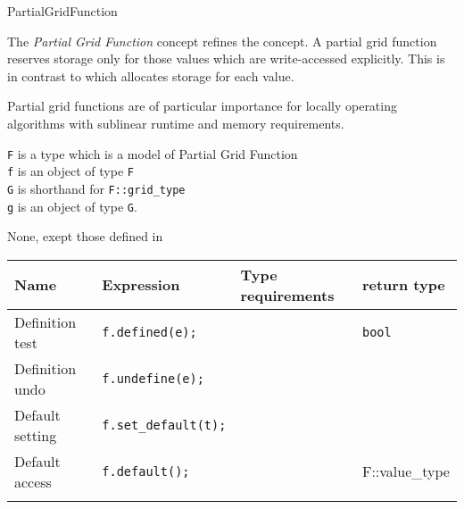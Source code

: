 \begin{Label}{PartialGridFunction}
\end{Label}


The  {\em Partial Grid Function\/} concept refines the 
 concept.
A partial grid function reserves storage only for those values which are
write-accessed explicitly.
This is in contrast to 
which allocates storage for each value.

Partial grid functions are of particular importance for locally operating 
algorithms with sublinear runtime and memory requirements.


{\tt F} is a type which is a model of  Partial Grid  Function 
\\
{\tt f} is an object of type  {\tt F}
\\
{\tt G} is shorthand for  {\tt F::grid\_type}
\\
{\tt g} is an object of type  {\tt G}.

\begin{ifhtml}
None, exept those defined in
\end{ifhtml}

\begin{tabular}{llll} 
  \hline
  \bf  Name  &\bf  Expression  &\bf  Type requirements  & \bf  return type  \\ 
  \hline
  Definition test  &
  {\tt f.defined(e);} &
  ~ &
  {\tt bool} 
  \\ 
  Definition undo &
  {\tt f.undefine(e);} &
  ~ &
  ~
  \\ 
  Default setting &
  {\tt f.set\_default(t);} &
  ~ &
  ~ 
  \\ 
  Default access &
  {\tt f.default();} &
  ~ &
  F::value\_type 
  \\ 
  \hline
  \\
\end{tabular}


